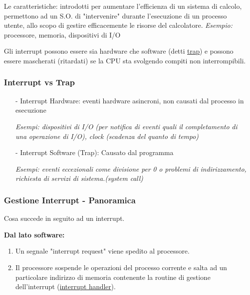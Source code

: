 Le caratteristiche: introdotti per aumentare l'efficienza di un sistema di calcolo, permettono ad un S.O. di "intervenire" durante l'esecuzione di un processo utente, allo scopo di gestire efficacemente le risorse del calcolatore.
\textit{Esempio:} processore, memoria, dispositivi di I/O

Gli interrupt possono essere sia hardware che software (detti \underline{trap})
e possono essere mascherati (ritardati) se la CPU sta svolgendo compiti non interrompibili.

\subsubsection{Interrupt vs Trap}

\begin{itemize}
    \item[-] Interrupt Hardware: eventi hardware asincroni, non causati dal processo in esecuzione

\textit{Esempi: dispositivi di I/O
(per notifica di eventi quali il completamento di una operazione di I/O), clock (scadenza del quanto di tempo)}
\item[-] Interrupt Software (Trap): Causato dal programma

\textit{Esempi: eventi eccezionali come divisione per 0 o problemi di indirizzamento, richiesta di servizi di sistema.(system call)}
\end{itemize}

\subsubsection{Gestione Interrupt - Panoramica}
Cosa succede in seguito ad un interrupt.
\newline

\textbf{Dal lato software:}
\begin{enumerate}
    \item Un segnale "interrupt request" viene spedito al processore.
    \item Il processore sospende le operazioni del processo corrente e salta ad un particolare indirizzo di memoria contenente la routine di gestione dell'interrupt (\underline{interrupt handler}).
\end{enumerate}




